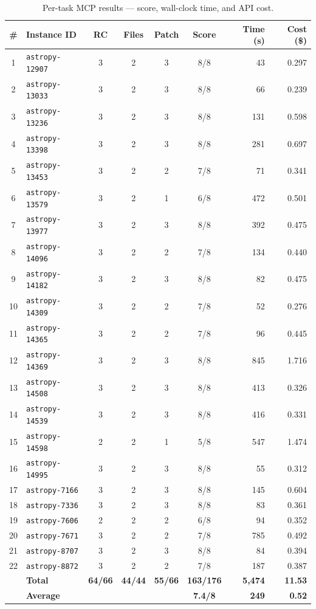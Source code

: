 \begin{table}[h]
\centering
\small
\caption{Per-task MCP results --- score, wall-clock time, and API cost.}\label{tab:per-task-mcp}
\setlength{\tabcolsep}{4pt}
\begin{tabular}{clccccrr}
\toprule
\textbf{\#} & \textbf{Instance ID} & \textbf{RC} & \textbf{Files} & \textbf{Patch} & \textbf{Score} & \textbf{Time (s)} & \textbf{Cost (\$)} \\
\midrule
 1 & \texttt{astropy-12907} & 3 & 2 & 3 & 8/8 &    43 & 0.297 \\
 2 & \texttt{astropy-13033} & 3 & 2 & 3 & 8/8 &    66 & 0.239 \\
 3 & \texttt{astropy-13236} & 3 & 2 & 3 & 8/8 &   131 & 0.598 \\
 4 & \texttt{astropy-13398} & 3 & 2 & 3 & 8/8 &   281 & 0.697 \\
 5 & \texttt{astropy-13453} & 3 & 2 & 2 & 7/8 &    71 & 0.341 \\
 6 & \texttt{astropy-13579} & 3 & 2 & 1 & 6/8 &   472 & 0.501 \\
 7 & \texttt{astropy-13977} & 3 & 2 & 3 & 8/8 &   392 & 0.475 \\
 8 & \texttt{astropy-14096} & 3 & 2 & 2 & 7/8 &   134 & 0.440 \\
 9 & \texttt{astropy-14182} & 3 & 2 & 3 & 8/8 &    82 & 0.475 \\
10 & \texttt{astropy-14309} & 3 & 2 & 2 & 7/8 &    52 & 0.276 \\
11 & \texttt{astropy-14365} & 3 & 2 & 2 & 7/8 &    96 & 0.445 \\
12 & \texttt{astropy-14369} & 3 & 2 & 3 & 8/8 &   845 & 1.716 \\
13 & \texttt{astropy-14508} & 3 & 2 & 3 & 8/8 &   413 & 0.326 \\
14 & \texttt{astropy-14539} & 3 & 2 & 3 & 8/8 &   416 & 0.331 \\
15 & \texttt{astropy-14598} & 2 & 2 & 1 & 5/8 &   547 & 1.474 \\
16 & \texttt{astropy-14995} & 3 & 2 & 3 & 8/8 &    55 & 0.312 \\
17 & \texttt{astropy-7166}  & 3 & 2 & 3 & 8/8 &   145 & 0.604 \\
18 & \texttt{astropy-7336}  & 3 & 2 & 3 & 8/8 &    83 & 0.361 \\
19 & \texttt{astropy-7606}  & 2 & 2 & 2 & 6/8 &    94 & 0.352 \\
20 & \texttt{astropy-7671}  & 3 & 2 & 2 & 7/8 &   785 & 0.492 \\
21 & \texttt{astropy-8707}  & 3 & 2 & 3 & 8/8 &    84 & 0.394 \\
22 & \texttt{astropy-8872}  & 3 & 2 & 2 & 7/8 &   187 & 0.387 \\
\midrule
   & \textbf{Total}  & \textbf{64/66} & \textbf{44/44} & \textbf{55/66} & \textbf{163/176} & \textbf{5{,}474} & \textbf{11.53} \\
   & \textbf{Average} &       &       &       & \textbf{7.4/8}   & \textbf{249} & \textbf{0.52} \\
\bottomrule
\end{tabular}
\end{table}

